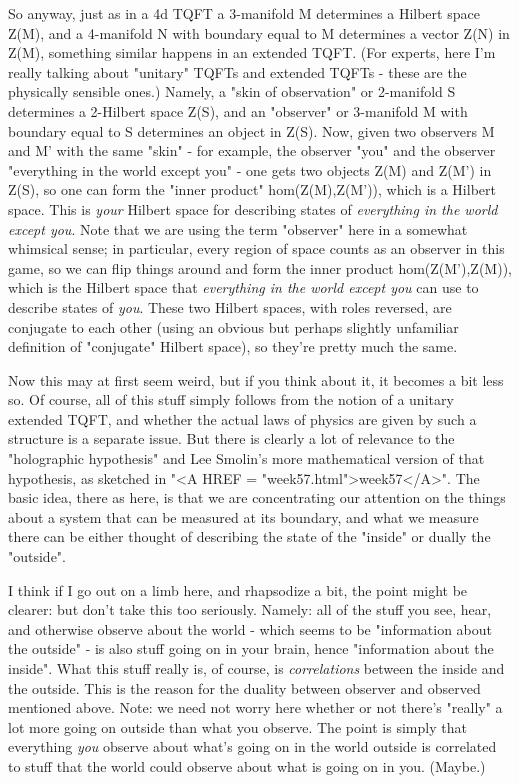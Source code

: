 So anyway, just as in a 4d TQFT a 3-manifold M determines a Hilbert space Z(M),
and a 4-manifold N with boundary equal to M determines a vector Z(N) in 
Z(M), something similar happens in an extended TQFT.  (For experts, here
I'm really talking about "unitary" TQFTs and extended TQFTs - these are
the physically sensible ones.)   Namely, a "skin of observation" or 2-manifold
S determines a 2-Hilbert space Z(S), and an "observer" or 3-manifold M with
boundary equal to S determines an object in Z(S).  Now, given two observers
M and M' with the same "skin" - for example, the observer "you" and the 
observer "everything in the world except you" - one gets two 
objects Z(M) and Z(M') in Z(S), so one can form the "inner product" 
hom(Z(M),Z(M')), which is a Hilbert space.  This is \emph{your} Hilbert 
space for describing states of \emph{everything in the world except you}.
Note that we are using the term "observer" here in a 
somewhat whimsical sense; in particular, every region of space counts as an 
observer in this game, so we can flip things around and form the inner product 
hom(Z(M'),Z(M)), which is the Hilbert space that \emph{everything in the world except you} can use to describe states of \emph{you}.  These two 
Hilbert spaces, with roles reversed, are conjugate to each 
other (using an obvious but perhaps slightly unfamiliar definition 
of "conjugate" Hilbert space), so they're pretty much the same.

Now this may at first seem weird, but if you think about it, it 
becomes a bit less so.   Of course, all of this stuff simply follows from the 
notion of a unitary extended TQFT, and whether the actual laws of physics 
are given by such a structure is a separate issue.  But there is 
clearly a lot of relevance to the "holographic hypothesis" and 
Lee Smolin's more mathematical version of that hypothesis,
as sketched in "<A HREF = "week57.html">week57</A>".  The basic idea, there as here, is that we are 
concentrating our attention on the things about a system that can be 
measured at its boundary, and what we measure there can be either 
thought of describing the state of the "inside" or dually the "outside".  

I think if I go out on a limb here, and rhapsodize a bit, the point might be 
clearer: but don't take this too seriously.  Namely: all of the stuff you 
see, hear, and otherwise observe about the world - which seems to 
be "information about the outside" - is also stuff going on in 
your brain, hence "information about the inside".  What this stuff 
really is, of course, is \emph{correlations} between the inside and the 
outside.  This is the reason for the duality between observer and 
observed mentioned above.  Note: we need not worry here whether or not 
there's "really" a lot more going on outside than what you observe.  
The point is simply that everything \emph{you} observe about what's going 
on in the world outside is correlated to stuff that the world 
could observe about what is going on in you.  (Maybe.)

